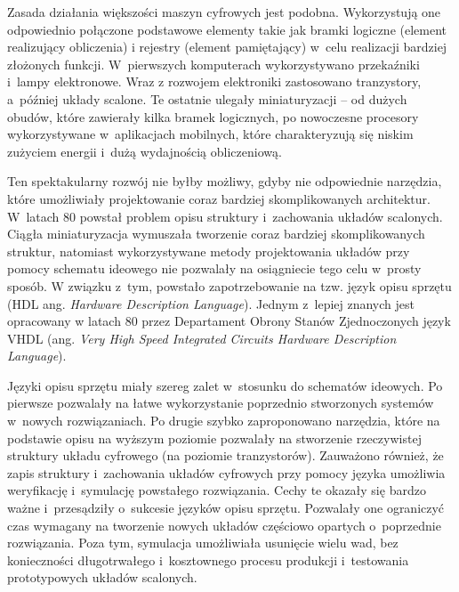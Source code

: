 Zasada działania większości maszyn cyfrowych jest podobna. 
Wykorzystują one odpowiednio połączone podstawowe elementy takie jak bramki logiczne (element realizujący obliczenia) i rejestry (element pamiętający) w~celu realizacji bardziej złożonych funkcji. 
W~pierwszych komputerach wykorzystywano przekaźniki i~lampy elektronowe. 
Wraz z rozwojem elektroniki zastosowano tranzystory, a~później układy scalone. 
Te ostatnie ulegały miniaturyzacji -- od dużych obudów, które zawierały kilka bramek logicznych, po nowoczesne procesory wykorzystywane w~aplikacjach mobilnych, które charakteryzują się niskim zużyciem energii i~dużą wydajnością obliczeniową.

Ten spektakularny rozwój nie byłby możliwy, gdyby nie odpowiednie narzędzia, które umożliwiały projektowanie coraz bardziej skomplikowanych architektur. 
W~latach 80 powstał problem opisu struktury i~zachowania układów scalonych. 
Ciągła miniaturyzacja wymuszała tworzenie coraz bardziej skomplikowanych struktur, natomiast wykorzystywane metody projektowania układów przy pomocy schematu ideowego nie pozwalały na osiągniecie tego celu w~prosty sposób. 
W związku z~tym, powstało zapotrzebowanie na tzw. język opisu sprzętu (HDL ang. \textit{Hardware Description Language}). 
Jednym z~lepiej znanych jest opracowany w latach 80 przez Departament Obrony Stanów Zjednoczonych język VHDL (ang. \textit{Very High Speed Integrated Circuits Hardware Description Language}). 

Języki opisu sprzętu miały szereg zalet w~stosunku do schematów ideowych. 
Po pierwsze pozwalały na łatwe wykorzystanie poprzednio stworzonych systemów w~nowych rozwiązaniach. 
Po drugie szybko zaproponowano narzędzia, które na podstawie opisu na wyższym poziomie pozwalały na stworzenie rzeczywistej struktury układu cyfrowego (na poziomie tranzystorów). 
Zauważono również, że zapis struktury i~zachowania układów cyfrowych przy pomocy języka umożliwia weryfikację i~symulację powstałego rozwiązania. 
Cechy te okazały się bardzo ważne i~przesądziły o~sukcesie języków opisu sprzętu. 
Pozwalały one ograniczyć czas wymagany na tworzenie nowych układów częściowo opartych o~poprzednie rozwiązania. 
Poza tym, symulacja umożliwiała usunięcie wielu wad, bez konieczności długotrwałego i~kosztownego procesu produkcji i~testowania prototypowych układów scalonych. 

